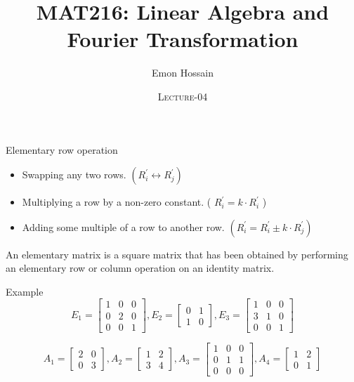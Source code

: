 \documentclass[11pt]{beamer}
\author[] %
{Emon Hossain\inst{1}}
\institute[University of Dhaka] %
{
  \inst{1}%
  Lecturer\\MNS department\\Brac University
}
\date[] %
{\textsc{Lecture-04}}
\title[]{MAT216: Linear Algebra and Fourier Transformation}
\theoremstyle{plain}
\begin{document}
\begin{frame}
\titlepage
\end{frame}

\begin{frame}{Elementary row operation}
    \begin{itemize}
        \item Swapping any two rows. $\left(R_i^{\prime} \leftrightarrow R_j^{\prime}\right)$
        \item Multiplying a row by a non-zero constant. ( $R_i^{\prime}=k \cdot R_i^{\prime}$ )
        \item Adding some multiple of a row to another row. $\left(R_i^{\prime}=R_i^{\prime} \pm k \cdot R_j^{\prime}\right)$
    \end{itemize}
An elementary matrix is a square matrix that has been obtained by
performing an elementary row or column operation on an identity
matrix.
\end{frame}

\begin{frame}{Example}
    $$
E_1 = \begin{bmatrix}
1 & 0 & 0 \\
0 & 2 & 0 \\
0 & 0 & 1
\end{bmatrix}, E_2 = \begin{bmatrix}
0 & 1 \\
1 & 0
\end{bmatrix},
E_3 = \begin{bmatrix}
1 & 0 & 0 \\
3 & 1 & 0 \\
0 & 0 & 1
\end{bmatrix}
$$

$$
A_1 = \begin{bmatrix}
2 & 0 \\
0 & 3
\end{bmatrix}, A_2 = \begin{bmatrix}
1 & 2 \\
3 & 4
\end{bmatrix}, 
A_3 = \begin{bmatrix}
1 & 0 & 0 \\
0 & 1 & 1 \\
0 & 0 & 0
\end{bmatrix},
A_4 = \begin{bmatrix}
1 & 2 \\
0 & 1
\end{bmatrix}
$$

\end{frame}
\end{document}
